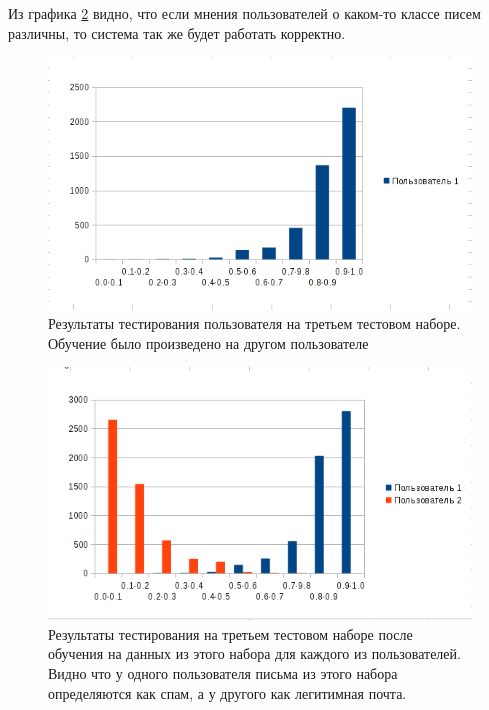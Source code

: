Из графика \ref{EXPERIMENT3} видно, что если мнения пользователей о каком-то классе писем различны, то система так же будет работать корректно.
\begin{figure}[h]
\begin{center}
\includegraphics[width=15cm]{img/experiment2}
\end{center}
\caption{Результаты тестирования пользователя на третьем тестовом наборе. Обучение было произведено на другом пользователе \cite{SAPC}}
\label{EXPERIMENT2}
\end{figure}

\begin{figure}[h]
\begin{center}
\includegraphics[width=15cm]{img/experiment3}
\end{center}
\caption{Результаты тестирования на третьем тестовом наборе после обучения на данных из этого набора для каждого из пользователей. Видно что у одного пользователя письма из этого набора определяются как спам, а у другого как легитимная почта.}
\label{EXPERIMENT3}
\end{figure}

